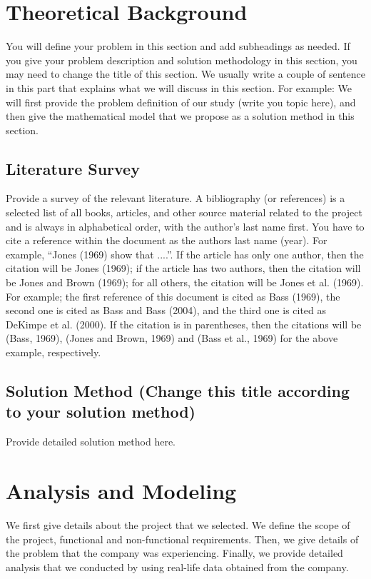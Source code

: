 \documentclass{mefsdp}
\begin{document}
	
	\section{Theoretical Background}
	You will define your problem in this section and add subheadings as needed. If you give your problem description and solution methodology in this section, you may need to change the title of this section. We usually write a couple of sentence in this part that explains what we will discuss in this section. For example: We will first provide the problem definition of our study (write you topic here), and then give the mathematical model that we propose as a solution method in this section.
	
	\subsection{Literature Survey}
	Provide a survey of the relevant literature. A bibliography (or references) is a selected list of all books, articles, and other source material related to the project and is always in alphabetical order, with the author's last name first. You have to cite a reference within the document as the authors last name (year). For example, “Jones (1969) show that ....”. If the article has only one author, then the citation will be Jones (1969); if the article has two authors, then the citation will be Jones and Brown (1969); for all others, the citation will be Jones et al. (1969). For example; the first reference of this document is cited as Bass (1969), the second one is cited as Bass and Bass (2004), and the third one is cited as DeKimpe et al. (2000). If the citation is in parentheses, then the citations will be (Bass, 1969), (Jones and Brown, 1969) and (Bass et al., 1969) for the above example, respectively. 
	\cite{DBLP:journals/corr/VaswaniSPUJGKP17}
	
	\subsection{Solution Method (Change this title according to your solution method)}
	Provide detailed solution method here.
	
	
	\section{Analysis and Modeling}
	We first give details about the project that we selected. We define the scope of the project, functional and non-functional requirements. Then, we give details of the problem that the company was experiencing. Finally, we provide detailed analysis that we conducted by using real-life data obtained from the company. 
	
\end{document}
